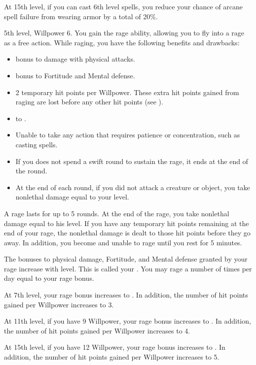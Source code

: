     At 15th level, if you can cast 6th level spells, you reduce your chance of arcane spell failure from wearing armor by a total of 20\%.

    \featpres 5th level, Willpower 6.
    \featben You gain the rage ability, allowing you to fly into a rage as a free action.
    While raging, you have the following benefits and drawbacks:
    \begin{itemize}
        \item {} bonus to damage with physical attacks.
        \item {} bonus to Fortitude and Mental defense.
        \item 2 temporary hit points per Willpower.
            These extra hit points gained from raging are lost before any other hit points (see ).
        \item {} to .
        \item Unable to take any action that requires patience or concentration, such as casting spells.
        \item If you does not spend a swift round to sustain the rage, it ends at the end of the round.
        \item At the end of each round, if you did not attack a creature or object, you take nonlethal damage equal to your level.
    \end{itemize}

    A rage lasts for up to 5 rounds.
    At the end of the rage, you take nonlethal damage equal to his level.
    If you have any temporary hit points remaining at the end of your rage, the nonlethal damage is dealt to those hit points before they go away.
    In addition, you become \fatigued and unable to rage until you rest for 5 minutes.

    The bonuses to physical damage, Fortitude, and Mental defense granted by your rage increase with level.
    This is called your .
    You may rage a number of times per day equal to your rage bonus.

    At 7th level, your rage bonus increases to .
    In addition, the number of hit points gained per Willpower increases to 3.

    At 11th level, if you have 9 Willpower, your rage bonus increases to .
    In addition, the number of hit points gained per Willpower increases to 4.

    At 15th level, if you have 12 Willpower, your rage bonus increases to .
    In addition, the number of hit points gained per Willpower increases to 5.

